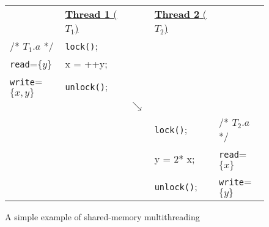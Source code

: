 \begin{figure}[t]
\centering
\myfontsize
{
\begin{tabular}
{m{1.5cm} m{1.4cm} m{0.1cm} m{1.8cm} m{1.2cm}}
&\underline{{\bf Thread 1} ($T_1$)} & & \underline{ {\bf Thread 2}  ($T_2$)} &\\ 
 

/* \underline{$T_{1}.a$} */ & {\tt lock()}; && &\\
{\tt read}=$\{y\}$  &  x = ++y;&& &\\
{\tt write}=$\{x, y\}$  & {\tt unlock()};&& &\\
        &  &  $\searrow$ & & \\
   

&&  & {\tt lock()}; &  /* \underline{$T_{2}.a$ }*/\\
&&  & y = 2* x;    & {\tt read}=$\{x\}$  \\
&  &  & {\tt unlock()}; &  {\tt write}=$\{y\}$ \\  
\end{tabular}
}


\caption{ A simple example of shared-memory multithreading}
\label{fig:simple-example}
\end{figure}
